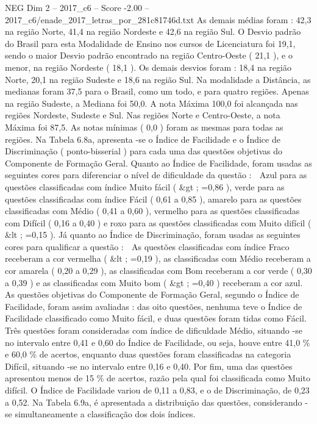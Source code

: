\begin{textsample}{NEG Dim 2 – 2017\_c6 – Score -2.00 – 2017\_c6/enade\_2017\_letras\_por\_281c81746d.txt}
As demais médias foram : 42,3 na região Norte, 41,4 na região Nordeste e 42,6 na região Sul.
O Desvio padrão do Brasil para esta Modalidade de Ensino nos cursos de Licenciatura foi 19,1, sendo o maior Desvio padrão encontrado na região Centro-Oeste ( 21,1 ), e o menor, na região Nordeste ( 18,1 ).
Os demais desvios foram : 18,4 na região Norte, 20,1 na região Sudeste e 18,6 na região Sul.
Na modalidade a Distância, as medianas foram 37,5 para o Brasil, como um todo, e para quatro regiões.
Apenas na região Sudeste, a Mediana foi 50,0.
A nota Máxima 100,0 foi alcançada nas regiões Nordeste, Sudeste e Sul.
Nas regiões Norte e Centro-Oeste, a nota Máxima foi 87,5.
As notas mínimas ( 0,0 ) foram as mesmas para todas as regiões.
Na Tabela 6.8a, apresenta -se o Índice de Facilidade e o Índice de Discriminação ( ponto-bisserial ) para cada uma das questões objetivas do Componente de Formação Geral.
Quanto ao Índice de Facilidade, foram usadas as seguintes cores para diferenciar o nível de dificuldade da questão :  Azul para as questões classificadas com índice Muito fácil ( \&gt ; =0,86 ), verde para as questões classificadas com índice Fácil ( 0,61 a 0,85 ), amarelo para as questões classificadas com Médio ( 0,41 a 0,60 ), vermelho para as questões classificadas com Difícil ( 0,16 a 0,40 ) e roxo para as questões classificadas com Muito difícil ( \&lt ; =0,15 ).
Já quanto ao Índice de Discriminação, foram usadas as seguintes cores para qualificar a questão :  As questões classificadas com índice Fraco receberam a cor vermelha ( \&lt ; =0,19 ), as classificadas com Médio receberam a cor amarela ( 0,20 a 0,29 ), as classificadas com Bom receberam a cor verde ( 0,30 a 0,39 ) e as classificadas com Muito bom ( \&gt ; =0,40 ) receberam a cor azul.
As questões objetivas do Componente de Formação Geral, segundo o Índice de Facilidade, foram assim avaliadas : das oito questões, nenhuma teve o Índice de Facilidade classificado como Muito fácil, e duas questões foram tidas como Fácil.
Três questões foram consideradas com índice de dificuldade Médio, situando -se no intervalo entre 0,41 e 0,60 do Índice de Facilidade, ou seja, houve entre 41,0 \% e 60,0 \% de acertos, enquanto duas questões foram classificadas na categoria Difícil, situando -se no intervalo entre 0,16 e 0,40.
Por fim, uma das questões apresentou menos de 15 \% de acertos, razão pela qual foi classificada como Muito difícil.
O Índice de Facilidade variou de 0,11 a 0,83, e o de Discriminação, de 0,23 a 0,52.
Na Tabela 6.9a, é apresentada a distribuição das questões, considerando -se simultaneamente a classificação dos dois índices.

\end{textsample}
